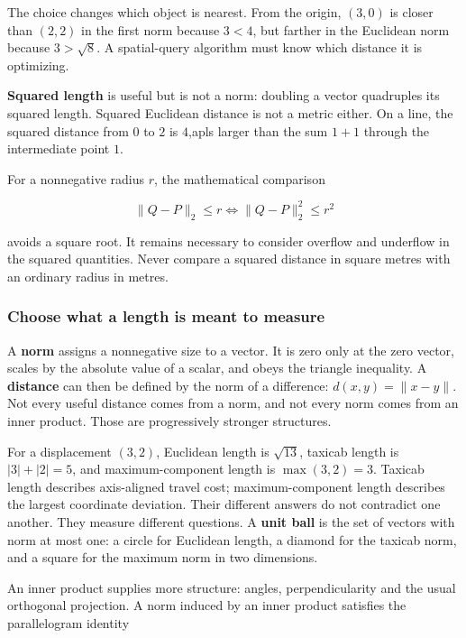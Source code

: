 The choice changes which object is nearest. From the origin, \((3,0)\) is closer than \((2,2)\) in the first norm because \(3<4\), but farther in the Euclidean norm because \(3>\sqrt8\). A spatial-query algorithm must know which distance it is optimizing.

\textbf{Squared length} is useful but is not a norm: doubling a vector quadruples its squared length. Squared Euclidean distance is not a metric either. On a line, the squared distance from \(0\) to \(2\) is \(4\),apls larger than the sum \(1+1\) through the intermediate point \(1\).

For a nonnegative radius \(r\), the mathematical comparison

\[
\|Q-P\|_2\le r
\iff\|Q-P\|_2^2\le r^2
\]

avoids a square root. It remains necessary to consider overflow and underflow in the squared quantities. Never compare a squared distance in square metres with an ordinary radius in metres.

\subsubsection{Choose what a length is meant to measure}\label{01-foundations-i-ch017-choose-what-a-length-is-meant-to-measure}

A \textbf{norm} assigns a nonnegative size to a vector. It is zero only at the zero vector, scales by the absolute value of a scalar, and obeys the triangle inequality. A \textbf{distance} can then be defined by the norm of a difference: \(d(x,y)=\|x-y\|\). Not every useful distance comes from a norm, and not every norm comes from an inner product. Those are progressively stronger structures.

For a displacement \((3,2)\), Euclidean length is \(\sqrt{13}\), taxicab length is \(|3|+|2|=5\), and maximum-component length is \(\max(3,2)=3\). Taxicab length describes axis-aligned travel cost; maximum-component length describes the largest coordinate deviation. Their different answers do not contradict one another. They measure different questions. A \textbf{unit ball} is the set of vectors with norm at most one: a circle for Euclidean length, a diamond for the taxicab norm, and a square for the maximum norm in two dimensions.

An inner product supplies more structure: angles, perpendicularity and the usual orthogonal projection. A norm induced by an inner product satisfies the parallelogram identity

